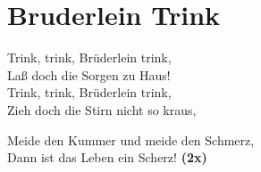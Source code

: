 \section{Bruderlein Trink}

Trink, trink, Brüderlein trink,\\
Laß doch die Sorgen zu Haus!\\
Trink, trink, Brüderlein trink,\\
Zieh doch die Stirn nicht so kraus,

Meide den Kummer und meide den Schmerz,\\
Dann ist das Leben ein Scherz! \textbf{(2x)}